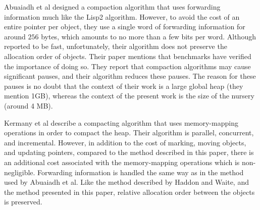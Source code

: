 Abuaiadh et al \cite{Abuaiadh:2004:EPH:1028976.1028995} designed a
compaction algorithm that uses forwarding information much like the
Lisp2 algorithm.  However, to avoid the cost of an entire pointer per
object, they use a single word of forwarding information for around
$256$ bytes, which amounts to no more than a few bits per word.
Although reported to be fast, unfortunately, their algorithm does not
preserve the allocation order of objects.  Their paper mentions that
benchmarks have verified the importance of doing so.  They report that
compaction algorithms may cause significant pauses, and their
algorithm reduces these pauses.  The reason for these pauses is no
doubt that the context of their work is a large global heap (they
mention 1GB), whereas the context of the present work is the size of
the nursery (around 4 MB).

Kermany et al \cite{Kermany:2006:CCI:1133981.1134023} describe a
compacting algorithm that uses memory-mapping operations in order to
compact the heap.  Their algorithm is parallel, concurrent, and
incremental.  However, in addition to the cost of marking, moving
objects, and updating pointers, compared to the method described in
this paper, there is an additional cost associated with the
memory-mapping operations which is non-negligible.  Forwarding
information is handled the same way as in the method used by Abuaiadh
et al.  Like the method described by Haddon and Waite, and the method
presented in this paper, relative allocation order between the objects
is preserved.
